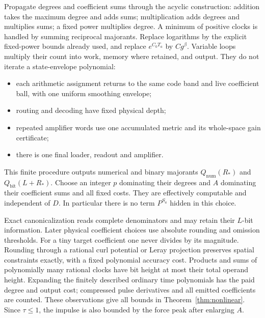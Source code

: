 \documentclass[11pt,a4paper]{amsart}
\theoremstyle{definition}
\theoremstyle{remark}
\numberwithin{equation}{section}
\begin{document}
Propagate degrees and coefficient sums through the acyclic construction:
addition takes the maximum degree and adds sums; multiplication adds degrees
and multiplies sums; a fixed power multiplies degree. A minimum of positive
clocks is handled by summing reciprocal majorants. Replace logarithms by the
explicit fixed-power bounds already used, and replace $e^{C_0T_a}$ by
$Cg^\beta$. Variable loops multiply their count into work, memory where
retained, and output. They do not iterate a state-envelope polynomial:
\begin{itemize}
\item each arithmetic assignment returns to the same code band and live
coefficient ball, with one uniform smoothing envelope;
\item routing and decoding have fixed physical depth;
\item repeated amplifier words use one accumulated metric and its whole-space
gain certificate;
\item there is one final loader, readout and amplifier.
\end{itemize}
This finite procedure outputs numerical and binary majorants
$Q_{\mathrm{num}}(R_*)$ and $Q_{\mathrm{bit}}(L+R_*)$. Choose an integer
$p$ dominating their degrees and $A$ dominating their coefficient sums and
all fixed costs. They are effectively computable and independent of $D$.
In particular there is no term $P^{S_a}$ hidden in this choice.

Exact canonicalization reads complete denominators and may retain their
$L$-bit information. Later physical coefficient choices use absolute rounding
and omission thresholds. For a tiny target coefficient one never divides by
its magnitude. Rounding through a rational curl potential or Leray projection
preserves spatial constraints exactly, with a fixed polynomial accuracy cost.
Products and sums of polynomially many rational clocks have bit height at
most their total operand height. Expanding the finitely described ordinary
time polynomials has the paid degree and output cost; compressed pulse
derivatives and all emitted coefficients are counted. These observations give
all bounds in Theorem~\ref{thm:nonlinear}. Since $\tau\le1$, the impulse is
also bounded by the force peak after enlarging $A$.
\end{document}
